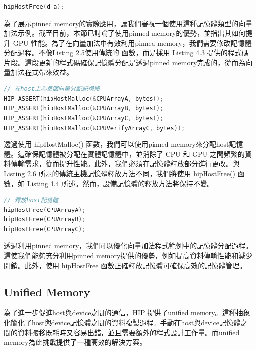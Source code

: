 \begin{lstlisting}[language=C, caption={釋放pinned memory}, label={2nd:example}]
hipHostFree(d_a);
\end{lstlisting}


為了展示pinned memory的實際應用，讓我們審視一個使用這種記憶體類型的向量加法示例。截至目前，本節已討論了使用pinned memory的優勢，並指出其如何提升 GPU 性能。為了在向量加法中有效利用pinned memory，我們需要修改記憶體分配過程。不像Listing 2.5使用傳統的  函數，而是採用 Listing 4.3 提供的程式碼片段。這段更新的程式碼確保記憶體分配是透過pinned memory完成的，從而為向量加法程式帶來效益。

\begin{lstlisting}[language=C, caption={在向量加法範例中使用host記憶體配置}, label={3rd:example}]
// 在host上為每個向量分配記憶體
HIP_ASSERT(hipHostMalloc(&CPUArrayA, bytes));
HIP_ASSERT(hipHostMalloc(&CPUArrayB, bytes));
HIP_ASSERT(hipHostMalloc(&CPUArrayC, bytes));
HIP_ASSERT(hipHostMalloc(&CPUVerifyArrayC, bytes));
\end{lstlisting}

透過使用 hipHostMalloc() 函數，我們可以使用pinned memory來分配host記憶體。這確保記憶體被分配在實體記憶體中，並消除了 CPU 和 GPU 之間頻繁的資料傳輸需求，從而提升性能。此外，我們必須在記憶體釋放部分進行更改。與 Listing 2.6 所示的傳統主機記憶體釋放方法不同，我們將使用 hipHostFree() 函數，如 Listing 4.4 所述。然而，設備記憶體的釋放方法將保持不變。

\begin{lstlisting}[language=C, caption={釋放hostpinned memory}, label={4th:example}]
// 釋放host記憶體
hipHostFree(CPUArrayA);
hipHostFree(CPUArrayB);
hipHostFree(CPUArrayC);
\end{lstlisting}

透過利用pinned memory，我們可以優化向量加法程式範例中的記憶體分配過程。這使我們能夠充分利用pinned memory提供的優勢，例如提高資料傳輸性能和減少開銷。此外，使用 hipHostFree 函數正確釋放記憶體可確保高效的記憶體管理。

\subsection{Unified Memory}

為了進一步促進host與device之間的通信，HIP 提供了unified memory。這種抽象化簡化了host與device記憶體之間的資料複製過程。手動在host與device記憶體之間的資料搬移既耗時又容易出錯，並且需要額外的程式設計工作量。而unified memory為此挑戰提供了一種高效的解決方案。

